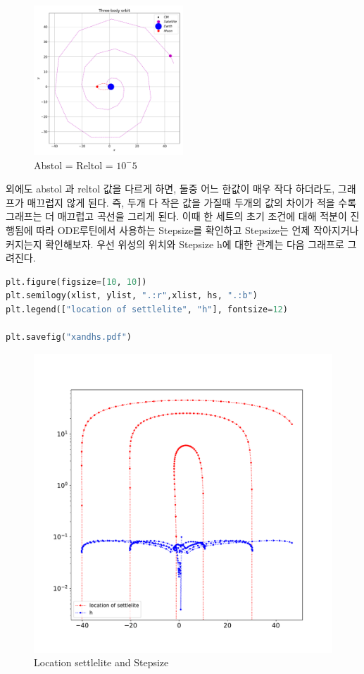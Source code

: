 \documentclass[11pt]{article}
\begin{document}
\begin{figure}[!ht]
  \centering
  \includegraphics[width=0.5\textwidth]{Three4.pdf}
  \caption{Abstol = Reltol = $10^-5$}
\end{figure}
외에도 abstol 과 reltol 값을 다르게 하면, 둘중 어느 한값이 매우 작다 하더라도, 그래프가 매끄럽지 않게 된다. 즉, 두개 다 작은 값을 가질때 두개의 값의 차이가 적을 수록 그래프는 더 매끄럽고 곡선을 그리게 된다.  이때 한 세트의 초기 조건에 대해 적분이 진행됨에 따라 ODE루틴에서 사용하는 Stepsize를 확인하고 Stepsize는 언제 작아지거나 커지는지 확인해보자. 우선 위성의 위치와 Stepsize h에 대한 관계는 다음 그래프로 그려진다.
\begin{lstlisting}[language=Python]
plt.figure(figsize=[10, 10])
plt.semilogy(xlist, ylist, ".:r",xlist, hs, ".:b")
plt.legend(["location of settlelite", "h"], fontsize=12)

plt.savefig("xandhs.pdf")
\end{lstlisting}

\begin{figure}[!ht]
  \centering
  \includegraphics[width=1\textwidth]{xandhs.pdf}
  \caption{Location settlelite and Stepsize}
\end{figure}
\end{document}
